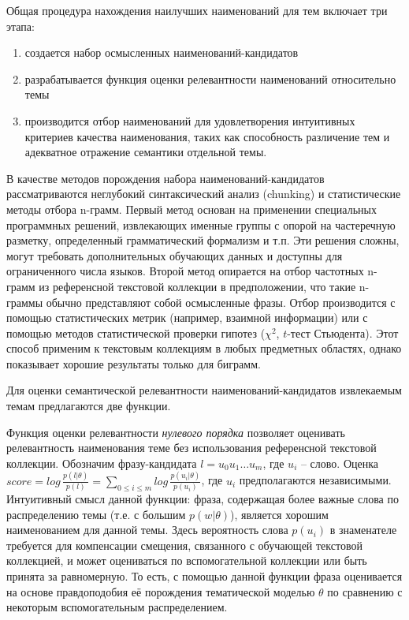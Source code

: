 Общая процедура нахождения наилучших наименований для тем включает три этапа:
\begin{enumerate}
    \item создается набор осмысленных наименований-кандидатов 
    \item разрабатывается функция оценки релевантности наименований относительно темы
    \item производится отбор наименований для удовлетворения интуитивных критериев качества наименования, таких как способность различение тем и адекватное отражение семантики отдельной темы. 
\end{enumerate}

В качестве методов порождения набора наименований-кандидатов рассматриваются неглубокий синтаксический анализ (chunking) и статистические методы отбора n-грамм. Первый метод основан на применении специальных программных решений, извлекающих именные группы с опорой на частеречную разметку, определенный грамматический формализм и т.п. Эти решения сложны, могут требовать дополнительных обучающих данных и доступны для ограниченного числа языков. Второй метод опирается на отбор частотных n-грамм из референсной текстовой коллекции в предположении, что такие n-граммы обычно представляют собой осмысленные фразы. Отбор производится с помощью статистических метрик  (например, взаимной информации) или с помощью методов статистической проверки гипотез ($\chi^2$, $t$-тест Стьюдента). Этот способ применим к текстовым коллекциям в любых предметных областях, однако показывает хорошие результаты только для биграмм.

Для оценки семантической релевантности наименований-кандидатов извлекаемым темам предлагаются две функции.

Функция оценки релевантности \textit{нулевого порядка} позволяет оценивать релевантность наименования теме без использования референсной текстовой коллекции. Обозначим фразу-кандидата $l = u_0 u_1 \ldots u_m$, где $u_i$ -- слово. Оценка $score = log \, \frac{p(l|\theta)}{p(l)} = \sum_{0 \leqslant i \leqslant m} log \, \frac{p(u_i|\theta)}{p(u_i)}$, где $u_i$ предполагаются независимыми. Интуитивный смысл данной функции: фраза, содержащая более важные слова по распределению темы (т.е. с большим $p(w|\theta)$), является хорошим наименованием для данной темы. Здесь вероятность слова $p(u_i)$ в знаменателе требуется для компенсации смещения, связанного с обучающей текстовой коллекцией, и может оцениваться по вспомогательной коллекции или быть принята за равномерную. То есть, с помощью данной функции фраза оценивается на основе правдоподобия её порождения тематической моделью $\theta$ по сравнению с некоторым вспомогательным распределением.

